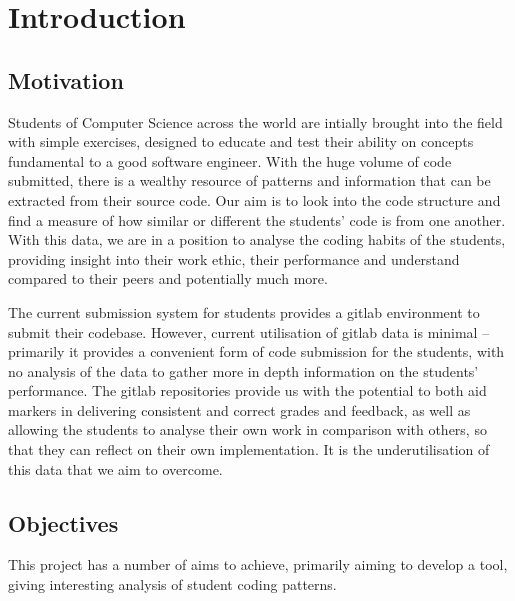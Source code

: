 
\chapter{Introduction} %

\label{Introduction} %


\section{Motivation}

Students of Computer Science across the world are intially brought into the field
with simple exercises, designed to educate and test their ability on concepts
fundamental to a good software engineer. With the huge volume of code submitted,
there is a wealthy resource of patterns and information that can be extracted
from their source code. Our aim is to look into the code structure and find
a measure of how similar or different the students' code is from one another.
With this data, we are in a position to analyse the coding habits of the students,
providing insight into their work ethic, their performance and understand compared
to their peers and potentially much more.

The current submission system for students provides a gitlab
environment to submit their codebase. However, current utilisation of gitlab 
data is minimal -- primarily it provides a
convenient form of code submission for the students, with no analysis of the 
data to gather more in depth information on the students' performance.
The gitlab repositories provide us with the potential to both aid markers
in delivering consistent and correct grades and feedback, as well as allowing
the students to analyse their own work in comparison with others, so that they
can reflect on their own implementation. It is the underutilisation of this
data that we aim to overcome.

\section{Objectives}
This project has a number of aims to achieve, primarily aiming to develop a 
tool, giving interesting analysis of student coding patterns. 

